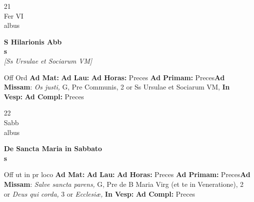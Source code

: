 \documentclass[10pt, openany]{book}
\begin{document}
        \begin{center}
            \begin{minipage}{3.5in}
                \vspace{2em}
                \begin{minipage}{0.5in}
                    {\Huge 21} \\
                    {\normalsize Fer VI} \\
                    {\normalsize albus}
                \end{minipage}
                \begin{minipage}{3.0in}
                    \textbf{ \large S Hilarionis Abb \\
                    \textnormal{\normalsize s}} \\ \textit{[Ss Ursulae et Sociarum VM]} \\ 
                \end{minipage}
                \begin{justify}Off Ord
                    \textbf{Ad Mat: }
                    \textbf{Ad Lau: }
                    \textbf{Ad Horas: }Preces
                    \textbf{Ad Primam: }Preces\textbf{Ad Missam}: \textit{Os justi,} G, Pre Communis, 2 or Ss Ursulae et Sociarum VM,  
                    \textbf{In Vesp: }
                    \textbf{Ad Compl: }Preces
                \end{justify}
            \end{minipage}
        \end{center}
    
        \begin{center}
            \begin{minipage}{3.5in}
                \vspace{2em}
                \begin{minipage}{0.5in}
                    {\Huge 22} \\
                    {\normalsize Sabb} \\
                    {\normalsize albus}
                \end{minipage}
                \begin{minipage}{3.0in}
                    \textbf{ \large De Sancta Maria in Sabbato \\
                    \textnormal{\normalsize s}} \\ 
                \end{minipage}
                \begin{justify}Off ut in pr loco
                    \textbf{Ad Mat: }
                    \textbf{Ad Lau: }
                    \textbf{Ad Horas: }Preces
                    \textbf{Ad Primam: }Preces\textbf{Ad Missam}: \textit{Salve sancta parens,} G, Pre de B Maria Virg (et te in Veneratione), 2 or \textit{Deus qui corda,} 3 or \textit{Ecclesiæ,}  
                    \textbf{In Vesp: }
                    \textbf{Ad Compl: }Preces
                \end{justify}
            \end{minipage}
        \end{center}
    
\end{document}
